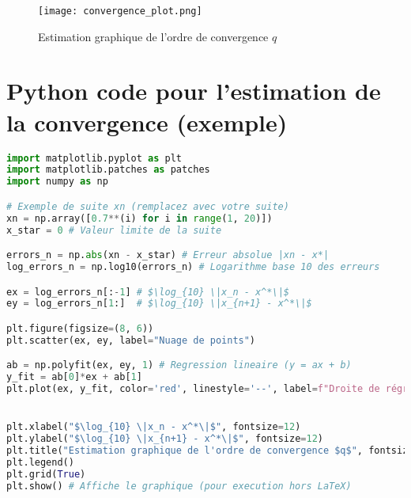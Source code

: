\documentclass{article}
\begin{document}
\begin{figure}[h]
    \centering
    \texttt{[image: convergence\_plot.png]}
    \caption{Estimation graphique de l'ordre de convergence $q$}
    \label{fig:convergence_order_estimation}
\end{figure}


\section{Python code pour l'estimation de la convergence (exemple)}

\begin{lstlisting}[language=Python, caption=Code Python pour l'estimation de la convergence, label=lst:convergence_code]
import matplotlib.pyplot as plt
import matplotlib.patches as patches
import numpy as np

# Exemple de suite xn (remplacez avec votre suite)
xn = np.array([0.7**(i) for i in range(1, 20)])
x_star = 0 # Valeur limite de la suite

errors_n = np.abs(xn - x_star) # Erreur absolue |xn - x*|
log_errors_n = np.log10(errors_n) # Logarithme base 10 des erreurs

ex = log_errors_n[:-1] # $\log_{10} \|x_n - x^*\|$
ey = log_errors_n[1:]  # $\log_{10} \|x_{n+1} - x^*\|$

plt.figure(figsize=(8, 6))
plt.scatter(ex, ey, label="Nuage de points")

ab = np.polyfit(ex, ey, 1) # Regression lineaire (y = ax + b)
y_fit = ab[0]*ex + ab[1]
plt.plot(ex, y_fit, color='red', linestyle='--', label=f"Droite de régression: $y = {ab[0]:.2f}x + {ab[1]:.2f}$")


plt.xlabel("$\log_{10} \|x_n - x^*\|$", fontsize=12)
plt.ylabel("$\log_{10} \|x_{n+1} - x^*\|$", fontsize=12)
plt.title("Estimation graphique de l'ordre de convergence $q$", fontsize=14)
plt.legend()
plt.grid(True)
plt.show() # Affiche le graphique (pour execution hors LaTeX)
\end{lstlisting}
\end{document}
